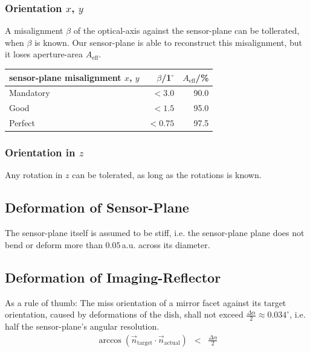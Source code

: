 \documentclass[11pt,a4paper,oneside,titlepage]{article}
\begin{document}
\subsubsection{Orientation $x$, $y$}
%
A misalignment $\beta$ of the optical-axis against the sensor-plane can be tollerated, when $\beta$ is known.
%
Our sensor-plane is able to reconstruct this misalignment, but it loses aperture-area $A_\text{eff}$.
%
%
\begin{table}[H]
    \begin{center}
        \begin{tabular}{lrr}
            sensor-plane misalignment $x$, $y$ & $\beta$/1$^\circ$ & $A_\text{eff}$/\%\\
            \toprule
            Mandatory & $< 3.0$ & 90.0\\
            Good      & $< 1.5$ & 95.0\\
            Perfect   & $< 0.75$ & 97.5\\
            \bottomrule
        \end{tabular}
    \end{center}
\end{table}
\subsubsection{Orientation in $z$}
%
Any rotation in $z$ can be tolerated, as long as the rotations is known.
\subsection{Deformation of Sensor-Plane}
%
The sensor-plane itself is assumed to be stiff, i.e. the sensor-plane plane does not bend or deform more than $0.05\,$a.u. across its diameter.
\subsection{Deformation of Imaging-Reflector}
%
As a rule of thumb:
The miss orientation of a mirror facet against its target orientation, caused by deformations of the dish, shall not exceed \mbox{$\frac{\Delta \alpha}{2} \approx 0.034^\circ$}, i.e. half the sensor-plane's angular resolution.
%
\begin{eqnarray}
\arccos \left( \vec{n}_\text{target} \cdot \vec{n}_\text{actual} \right) &<& \frac{\Delta \alpha}{2}
\end{eqnarray}
\end{document}
